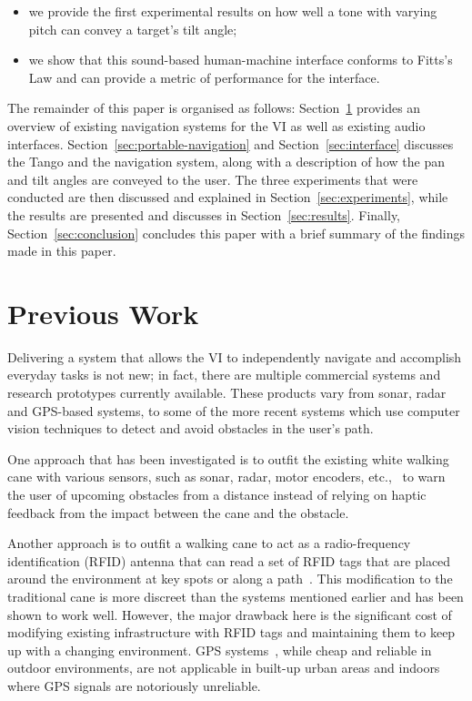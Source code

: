 \documentclass[format=sigconf, review=true, screen=true, anonymous=true]{acmart}
\begin{document}
\begin{itemize}
  \item we provide the first experimental results on how well a tone with varying pitch can convey a target's tilt angle; 
  \item we show that this sound-based human-machine interface conforms to Fitts's Law and can provide a metric of performance for the interface.
\end{itemize}

The remainder of this paper is organised as follows: Section~\ref{sec:lit-review} provides an overview of existing navigation systems for the VI as well as existing audio interfaces. Section~\ref{sec:portable-navigation} and Section~\ref{sec:interface} discusses the Tango and the navigation system, along with a description of how the pan and tilt angles are conveyed to the user. The three experiments that were conducted are then discussed and explained in Section~\ref{sec:experiments}, while the results are presented and discusses in Section~\ref{sec:results}. Finally, Section~\ref{sec:conclusion} concludes this paper with a brief summary of the findings made in this paper. 

\section{Previous Work}
\label{sec:lit-review}

Delivering a system that allows the VI to independently navigate and accomplish everyday tasks is not new; in fact, there are multiple commercial systems and research prototypes currently available. These products vary from sonar, radar and GPS-based systems, to some of the more recent systems which use computer vision techniques to detect and avoid obstacles in the user's path. 

One approach that has been investigated is to outfit the existing white walking cane with various sensors, such as sonar, radar, motor encoders, etc.,~\cite{ulrich1997, marion2008batcane} to warn the user of upcoming obstacles from a distance instead of relying on haptic feedback from the impact between the cane and the obstacle. 

Another approach is to outfit a walking cane to act as a radio-frequency identification (RFID) antenna that can read a set of RFID tags that are placed around the environment at key spots or along a path~\cite{faria2010electronic, willis2005}. This modification to the traditional cane is more discreet than the systems mentioned earlier and has been shown to work well. However, the major drawback here is the significant cost of modifying existing infrastructure with RFID tags and maintaining them to keep up with a changing environment. GPS systems~\cite{ran2004drishti, loomis2001navigating, kammoun2012navigation}, while cheap and reliable in outdoor environments, are not applicable in built-up urban areas and indoors where GPS signals are notoriously unreliable. 
\end{document}
